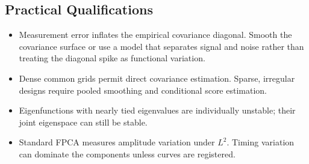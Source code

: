 \documentclass[12pt,oneside]{book}
\numberwithin{equation}{section}
\theoremstyle{definition}
\theoremstyle{plain}
\theoremstyle{remark}
\begin{document}
\subsection{Practical Qualifications}

\begin{itemize}
    \item Measurement error inflates the empirical covariance diagonal.
    Smooth the covariance surface or use a model that separates signal and
    noise rather than treating the diagonal spike as functional variation.
    \item Dense common grids permit direct covariance estimation. Sparse,
    irregular designs require pooled smoothing and conditional score
    estimation.
    \item Eigenfunctions with nearly tied eigenvalues are individually
    unstable; their joint eigenspace can still be stable.
    \item Standard FPCA measures amplitude variation under $L^2$. Timing
    variation can dominate the components unless curves are registered.
\end{itemize}
\end{document}
